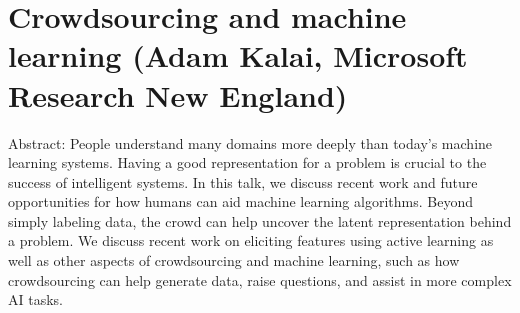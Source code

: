 \section{Crowdsourcing and machine learning (Adam Kalai, Microsoft Research New England)} 

Abstract: People understand many domains more deeply than today's machine learning systems. Having a good representation for a problem is crucial to the success of intelligent systems. In this talk, we discuss recent work and future opportunities for how humans can aid machine learning algorithms. Beyond simply labeling data, the crowd can help uncover the latent representation behind a problem. We discuss recent work on eliciting features using active learning as well as other aspects of crowdsourcing and machine learning, such as how crowdsourcing can help generate data, raise questions, and assist in more complex AI tasks.
